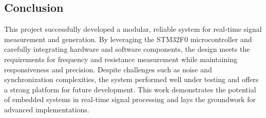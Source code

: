 \subsection{Conclusion}
This project successfully developed a modular, reliable system for real-time signal measurement and generation. By leveraging the STM32F0 microcontroller and carefully integrating hardware and software components, the design meets the requirements for frequency and resistance measurement while maintaining responsiveness and precision. Despite challenges such as noise and synchronization complexities, the system performed well under testing and offers a strong platform for future development. This work demonstrates the potential of embedded systems in real-time signal processing and lays the groundwork for advanced implementations.
